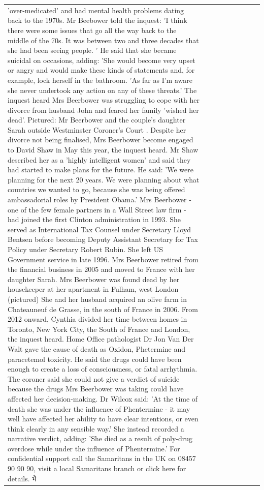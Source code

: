 \begin{table}[H]
\begin{tabular}{lllrlllll}
'over-medicated' and had mental health problems dating back to the 1970s. Mr Beebower told the inquest: 'I think there were some issues that go all the way back to the middle of the 70s. It was between two and three decades that she had been seeing people. ' He said that she became suicidal on occasions, adding: 'She would become very upset or angry and would make these kinds of statements and, for example, lock herself in the bathroom. 'As far as I'm aware she never undertook any action on any of these threats.' The inquest heard Mrs Beerbower was struggling to cope with her divorce from husband John and feared her family 'wished her dead'. Pictured: Mr Beerbower and the couple's daughter Sarah outside Westminster Coroner's Court . Despite her divorce not being finalised, Mrs Beerbower become engaged to David Shaw in May this year, the inquest heard. Mr Shaw described her as a 'highly intelligent women' and said they had started to make plans for the future. He said: 'We were planning for the next 20 years. We were planning about what countries we wanted to go, because she was being offered ambassadorial roles by President Obama.' Mrs Beerbower - one of the few female partners in a Wall Street law firm - had joined the first Clinton administration in 1993. She served as International Tax Counsel under Secretary Lloyd Bentsen before becoming Deputy Assistant Secretary for Tax Policy under Secretary Robert Rubin. She left US Government service in late 1996. Mrs Beerbower retired from the financial business in 2005 and moved to France with her daughter Sarah. Mrs Beerbower was found dead by her housekeeper at her apartment in Fulham, west London (pictured) She and her husband acquired an olive farm in Chateauneuf de Grasse, in the south of France in 2006. From 2012 onward, Cynthia divided her time between homes in Toronto, New York City, the South of France and London, the inquest heard. Home Office pathologist Dr Jon Van Der Walt gave the cause of death as Oxidon, Phetermine and paracetemol toxicity. He said the drugs could have been enough to create a loss of consciousness, or fatal arrhythmia. The coroner said she could not give a verdict of suicide because the drugs Mrs Beerbower was taking could have affected her decision-making. Dr Wilcox said: 'At the time of death she was under the influence of Phentermine - it may well have affected her ability to have clear intentions, or even think clearly in any sensible way.' She instead recorded a narrative verdict, adding: 'She died as a result of poly-drug overdose while under the influence of Phentermine.' For confidential support call the Samaritans in the UK on 08457 90 90 90, visit a local Samaritans branch or click here for details. भै \\

\end{tabular}
\end{table}
